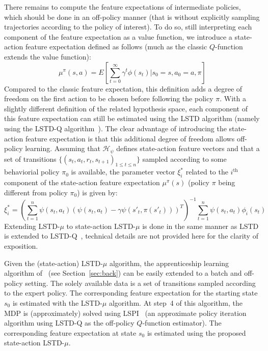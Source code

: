 \documentclass{article}
\begin{document}
There remains to compute the feature expectations of intermediate
policies, which should be done in an off-policy manner (that is
without explicitly sampling trajectories according to the policy of
interest). To do so, still interpreting each component of the
feature expectation as a value function, we introduce a state-action
feature expectation defined as follows (much as the classic
$Q$-function extends the value function):
\begin{equation}
  \mu^\pi(s,a) = E[\sum_{t=0}^\infty \gamma^t
  \phi(s_t)|s_0=s,a_0=a,\pi]
\end{equation}
Compared to the classic feature expectation, this definition adds a
degree of freedom on the first action to be chosen before following
the policy $\pi$. With a slightly different definition of the
related hypothesis space, each component of this feature expectation
can still be estimated using the LSTD algorithm (namely using the
LSTD-Q algorithm~\citep{lagoudakis2003least}). The clear advantage of
introducing the state-action feature expectation is that this
additional degree of freedom allows off-policy learning. Assuming
that $\mathcal{H}_\psi$ defines state-action feature vectors and
that a set of transitions $\{(s_t,a_t,r_t,s_{t+1})_{1\leq t \leq
n}\}$ sampled according to some behaviorial policy $\pi_0$ is
available, the parameter vector $\xi_i^*$ related to the
$i^\text{th}$ component of the state-action feature expectation
$\mu^\pi(s)$ (policy $\pi$ being different from policy $\pi_0$) is
given by:
\begin{equation}
  \xi_i^* = \left(\sum_{t=1}^n
  \psi(s_t,a_t)(\psi(s_t,a_t)-\gamma\psi(s'_{t},\pi(s'_t)))^T\right)^{-1}
  \sum_{t=1}^n \psi(s_t,a_t) \phi_i(s_t)
\end{equation}
Extending LSTD-$\mu$ to state-action LSTD-$\mu$ is done in the same
manner as LSTD is extended to LSTD-Q~\citep{lagoudakis2003least},
technical details are not provided here for the clarity of
exposition.

Given the (state-action) LSTD-$\mu$ algorithm, the apprenticeship
learning algorithm of~\citep{abbeel2004apprenticeship} (see
Section~\ref{sec:back}) can be easily extended to a batch and
off-policy setting. The solely available data is a set of
transitions sampled according to the expert policy. The
corresponding feature expectation for the starting state $s_0$ is
estimated with the LSTD-$\mu$ algorithm. At step~4 of this
algorithm, the MDP is (approximately) solved using
LSPI~\citep{lagoudakis2003least} (an approximate policy iteration
algorithm using LSTD-Q as the off-policy $Q$-function estimator).
The corresponding feature expectation at state $s_0$ is estimated
using the proposed state-action LSTD-$\mu$.
\end{document}
